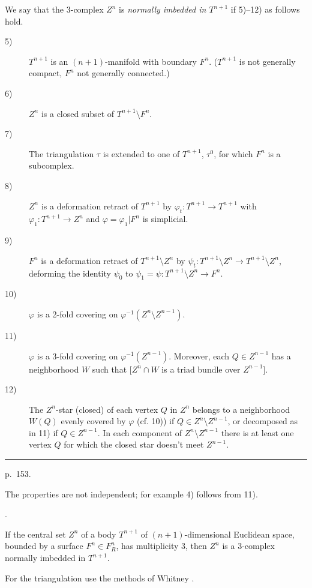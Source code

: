 \documentclass{amsart}
\theoremstyle{plain}
\theoremstyle{definition}
\begin{document}
We say that the 3-complex $Z^n$ is {\em normally imbedded in
$T^{n+1}$} if 5)--12) as follows hold.
\begin{description}
\item[5)] $T^{n+1}$ is an $(n+1)$-manifold with boundary $F^n$.
($T^{n+1}$ is not generally compact, $F^n$ not generally
connected.)
\item[6)] $Z^n$ is a closed subset of $T^{n+1}\setminus F^n$.
\item[7)] The triangulation $\tau$ is extended to one of
$T^{n+1}$, $\tau^0$, for which $F^n$ is a subcomplex.
\item[8)] $Z^n$ is a deformation retract of $T^{n+1}$ by
$\varphi_t : T^{n+1} \to T^{n+1}$ with $\varphi_1 : T^{n+1} \to
Z^n$ and $\varphi = \varphi_1|F^n$ is simplicial.
\item[9)] $F^n$ is a deformation retract of $T^{n+1} \setminus
Z^n$ by $\psi_t: T^{n+1} \setminus Z^n \to T^{n+1} \setminus Z^n$,
deforming the identity $\psi_0$ to $\psi_1 = \psi : T^{n+1}
\setminus Z^n \to F^n$.
\item[10)] $\varphi$ is a 2-fold covering on $\varphi^{-1}(Z^n
\setminus Z^{n-1})$.
\item[11)] $\varphi$ is a 3-fold covering on $\varphi^{-1}(Z^{n-1})$.
Moreover, each $Q \in Z^{n-1}$ has a neighborhood $W$ such that
[$Z^n \cap W$ is a triad bundle over $Z^{n-1}$].
\item[12)] The $Z^n$-star (closed) of each vertex $Q$ in $Z^n$
belongs to a neighborhood $W(Q)$ evenly covered by $\varphi$
(cf. 10)) if $Q \in Z^n \setminus Z^{n-1}$, or decomposed as in
11) if $Q \in Z^{n-1}$. In each component of $Z^n \setminus
Z^{n-1}$ there is at least one vertex $Q$ for which the closed
star doesn't meet $Z^{n-1}$.
\end{description}

\medskip
\hrule\smallskip
\noindent p.~153.
\medskip

 The properties are not independent; for
example 4) follows from 11).

.

\begin{lem}\label{Lemma 4} If the central set $Z^n$ of a body
$T^{n+1}$ of $(n+1)$-dimensional Euclidean space, bounded by a
surface $F^n \in F^n_R$, has multiplicity 3, then $Z^n$ is a
3-complex normally imbedded in $T^{n+1}$.
\end{lem}

For the triangulation use the methods of Whitney \cite[pp. 175-191]{W}.
\end{document}
